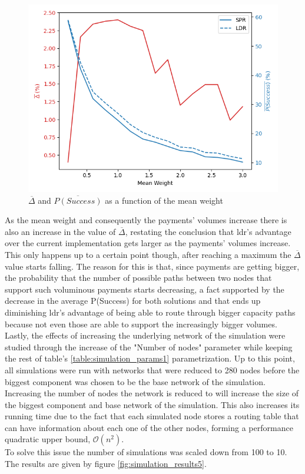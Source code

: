 \begin{figure}[H]
\begin{center}
  \includegraphics[width=\linewidth]{images/simulation_results4.png}
  \caption{$\overline{\Delta}$ and  $\overline{P(Success)}$ as a function of the mean weight}
  \label{fig:simulation_results4}
  \end{center}
\end{figure}

As the mean weight and consequently the payments' volumes increase there is also an increase in the value of $\overline{\Delta}$, restating the conclusion that \acrshort{ldr}'s advantage over the current implementation gets larger as the payments' volumes increase. This only happens up to a certain point though, after reaching a maximum the $\overline{\Delta}$ value starts falling. The reason for this is that, since payments are getting bigger, the probability that the number of possible paths between two nodes that support such voluminous payments starts decreasing, a fact supported by the decrease in the average P(Success) for both solutions and that ends up diminishing \acrshort{ldr}'s advantage of being able to route through bigger capacity paths because not even those are able to support the increasingly bigger volumes.\\
Lastly, the effects of increasing the underlying network of the simulation were studied through the increase of the "Number of nodes" parameter while keeping the rest of table's \ref{table:simulation_params1} parametrization. Up to this point, all simulations were run with networks that were reduced to 280 nodes before the biggest component was chosen to be the base network of the simulation. Increasing the number of nodes the network is reduced to will increase the size of the biggest component and base network of the simulation. This also increases its running time due to the fact that each simulated node stores a routing table that can have information about each one of the other nodes, forming a performance quadratic upper bound, $\mathcal{O}(n^2)$.\\
To solve this issue the number of simulations was scaled down from 100 to 10. The results are given by figure \ref{fig:simulation_results5}.\\

